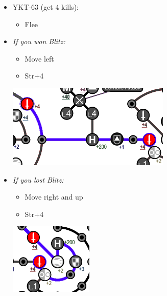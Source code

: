 \begin{encounters}
  \begin{itemize}
    \item YKT-63 (get 4 kills):
          \begin{itemize}
            \tidusf Attack
            \yunaf Attack
            \item Flee
          \end{itemize}
  \end{itemize}
\end{encounters}
\vfill
\begin{spheregrid}
  \begin{itemize}
    \yunaf
    \item \textit{If you won Blitz:}
          \begin{itemize}
            \item Move left
            \item Str+4
          \end{itemize}
          \includegraphics[width=.75\columnwidth]{graphics/Yuna_blitz_win_highroad_before_natus}
    \item \textit{If you lost Blitz:}
          \begin{itemize}
            \item Move right and up
            \item Str+4
          \end{itemize}
          \includegraphics[width=.6\columnwidth]{graphics/Yuna_blitz_loss_highroad_before_natus}
  \end{itemize}
\end{spheregrid}

